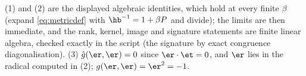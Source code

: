 (1) and (2) are the displayed algebraic identities, which hold at every finite $\beta$ (expand \eqref{eq:metricdef} with $\hb^{-1} = 1 + \beta P$ and divide); the limits are then immediate, and the rank, kernel, image and signature statements are finite linear algebra, checked exactly in the script (the signature by exact congruence diagonalisation). (3) $\hat g(\er, \er) = 0$ since $\er \cdot \et = 0$, and $\er$ lies in the radical computed in (2); $g(\er,\er) = \er^2 = -1$.
